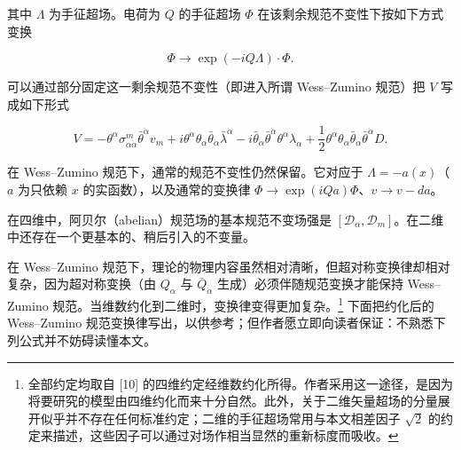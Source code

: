 其中 $\Lambda$ 为手征超场。电荷为 $Q$ 的手征超场 $\Phi$ 在该剩余规范不变性下按如下方式变换

\label{op:7}

\begin{equation}
\Phi\to\exp(-iQ\Lambda)\cdot\Phi.
\tag{2.10}
\end{equation}

可以通过部分固定这一剩余规范不变性（即进入所谓 Wess--Zumino 规范）把 $V$ 写成如下形式

\begin{equation}
V=-\theta^\alpha\sigma^m_{\alpha\dot\alpha}\bar\theta^{\dot\alpha}v_m+i\theta^\alpha\theta_\alpha\bar\theta_{\dot\alpha}\bar\lambda^{\dot\alpha}-i\bar\theta_{\dot\alpha}\bar\theta^{\dot\alpha}\theta^\alpha\lambda_\alpha+\frac{1}{2}\theta^\alpha\theta_\alpha\bar\theta_{\dot\alpha}\bar\theta^{\dot\alpha}D.
\tag{2.11}
\end{equation}


在 Wess--Zumino 规范下，通常的规范不变性仍然保留。它对应于 $\Lambda=-a(x)$（$a$ 为只依赖 $x$ 的实函数），以及通常的变换律 $\Phi\to\exp(iQa)\Phi$、$v\to v-da$。

在四维中，阿贝尔（abelian）规范场的基本规范不变场强是 $[\mathcal D_\alpha,\mathcal D_m]$。在二维中还存在一个更基本的、稍后引入的不变量。

在 Wess--Zumino 规范下，理论的物理内容虽然相对清晰，但超对称变换律却相对复杂，因为超对称变换（由 $Q_\alpha$ 与 $\bar Q_{\dot\alpha}$ 生成）必须伴随规范变换才能保持 Wess--Zumino 规范。当维数约化到二维时，变换律变得更加复杂。\footnote{全部约定均取自 [10] 的四维约定经维数约化所得。作者采用这一途径，是因为将要研究的模型由四维约化而来十分自然。此外，关于二维矢量超场的分量展开似乎并不存在任何标准约定；二维的手征超场常用与本文相差因子 $\sqrt2$ 的约定来描述，这些因子可以通过对场作相当显然的重新标度而吸收。} 下面把约化后的 Wess--Zumino 规范变换律写出，以供参考；但作者愿立即向读者保证：不熟悉下列公式并不妨碍读懂本文。

